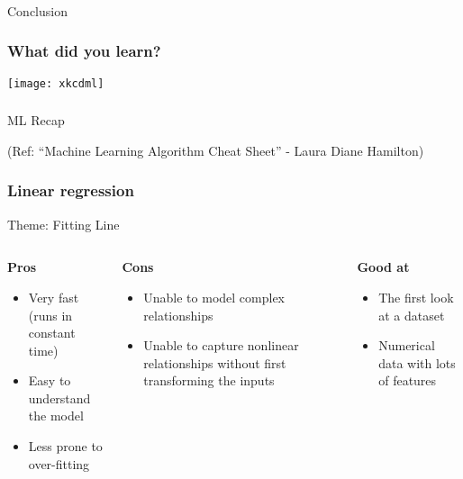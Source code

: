 \begin{frame}[fragile]\frametitle{}
\begin{center}
{\Large Conclusion}
\end{center}
\end{frame}

\begin{frame}[fragile]\frametitle{What did you learn?}
\begin{center}
\texttt{[image: xkcdml]}
\end{center}
\end{frame}

\begin{frame}[fragile]\frametitle{}
\begin{center}
{\Large ML Recap}

{\tiny (Ref: ``Machine Learning Algorithm Cheat Sheet'' - Laura Diane Hamilton)}
\end{center}
\end{frame}

\begin{frame}\frametitle{Linear regression}
Theme: Fitting Line

   \begin{columns}[t]
    \begin{column}{0.3\linewidth}
	\textbf{Pros}
		\begin{itemize}
		\item Very fast (runs in constant time)
		\item Easy to understand the model
		\item  Less prone to over-fitting
		\end{itemize}
    \end{column}
    \begin{column}{0.3\linewidth}
	\textbf{Cons}
			\begin{itemize}
		\item  Unable to model complex relationships
		\item Unable to capture nonlinear relationships without first
transforming the inputs
		\end{itemize}
    \end{column}
	
    \begin{column}{0.3\linewidth}
	\textbf{Good at}
			\begin{itemize}
		\item  The first look at a dataset
		\item  Numerical data with lots of features
		\end{itemize}
    \end{column}
	
  \end{columns}
\end{frame}


